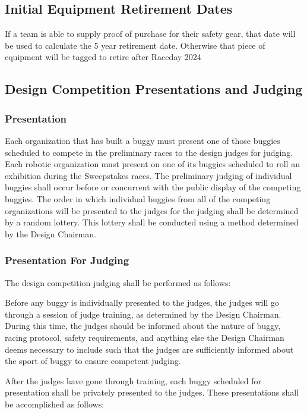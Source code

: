 \subsection*{Initial Equipment Retirement Dates}
If a team is able to supply proof of purchase for their safety gear, that date will be used to calculate the 5 year retirement date. Otherwise that piece of equipment will be tagged to retire after Raceday 2024

\subsection*{Design Competition Presentations and Judging} \label{DC}
\subsubsection*{Presentation}

	Each organization that has built a buggy must present one of those buggies scheduled to compete in the preliminary races to the design judges for judging. Each robotic organization must present on one of its buggies scheduled to roll an exhibition during the Sweepstakes races. The preliminary judging of individual buggies shall occur before or concurrent with the public display of the competing buggies. The order in which individual buggies from all of the competing organizations will be presented to the judges for the judging shall be determined by a random lottery. This lottery shall be conducted using a method determined by the Design Chairman.

\subsubsection*{Presentation For Judging}

	The design competition judging shall be performed as follows: \newline
	
	Before any buggy is individually presented to the judges, the judges will go through a session of judge training, as determined by the Design Chairman. During this time, the judges should be informed about the nature of buggy, racing protocol, safety requirements, and anything else the Design Chairman deems necessary to include such that the judges are sufficiently informed about the sport of buggy to ensure competent judging. 

	After the judges have gone through training, each buggy scheduled for presentation shall be privately presented to the judges. These presentations shall be accomplished as follows:
	

